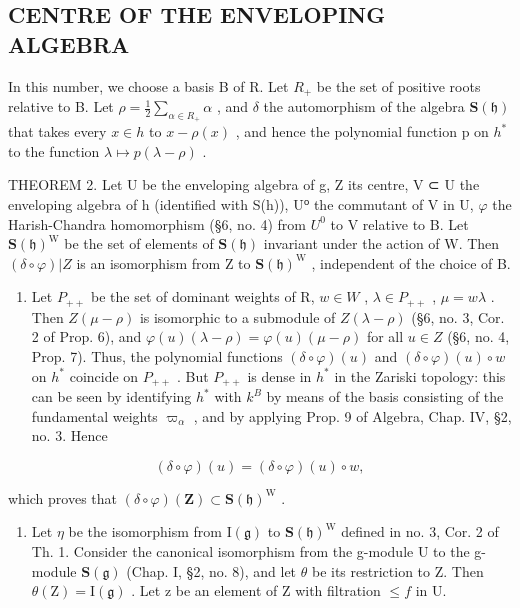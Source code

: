 \subsection{CENTRE OF THE ENVELOPING ALGEBRA}

In this number, we choose a basis B of R. Let \(R_{+}\) be the set of positive roots relative to B. Let \(\rho = \frac{1}{2} \sum_{\alpha \in R_{+}} \alpha\) , and \(\delta\) the automorphism of the algebra \(\mathbf{S}(\mathfrak{h})\) that takes every \(x \in h\) to \(x - \rho(x)\) , and hence the polynomial function p on \(h^{*}\) to the function \(\lambda \mapsto p(\lambda - \rho)\) .

THEOREM 2. Let U be the enveloping algebra of g, Z its centre, V ⊂ U the enveloping algebra of h (identified with S(h)), U⁰ the commutant of V in U, \(\varphi\) the Harish-Chandra homomorphism (§6, no. 4) from \(U^{0}\) to V relative to B. Let \(\mathbf{S}(\mathfrak{h})^{\mathrm{W}}\) be the set of elements of \(\mathbf{S}(\mathfrak{h})\) invariant under the action of W. Then \((\delta\circ\varphi)|Z\) is an isomorphism from Z to \(\mathbf{S}(\mathfrak{h})^{\mathrm{W}}\) , independent of the choice of B.

\begin{enumerate}
\def\labelenumi{\alph{enumi})}
\tightlist
\item
  Let \(P_{++}\) be the set of dominant weights of R, \(w \in W\) , \(\lambda \in P_{++}\) , \(\mu = w\lambda\) . Then \(Z(\mu - \rho)\) is isomorphic to a submodule of \(Z(\lambda - \rho)\) (§6, no. 3, Cor. 2 of Prop. 6), and \(\varphi(u)(\lambda - \rho) = \varphi(u)(\mu - \rho)\) for all \(u \in Z\) (§6, no. 4, Prop. 7). Thus, the polynomial functions \((\delta \circ \varphi)(u)\) and \((\delta \circ \varphi)(u) \circ w\) on \(h^{*}\) coincide on \(P_{++}\) . But \(P_{++}\) is dense in \(h^{*}\) in the Zariski topology: this can be seen by identifying \(h^{*}\) with \(k^{B}\) by means of the basis consisting of the fundamental weights \(\varpi_{\alpha}\) , and by applying Prop. 9 of Algebra, Chap. IV, §2, no. 3. Hence
\end{enumerate}

\[
(\delta \circ \varphi) (u) = (\delta \circ \varphi) (u) \circ w,
\]

which proves that \((\delta \circ \varphi)(\mathbf{Z}) \subset \mathbf{S}(\mathfrak{h})^{\mathrm{W}}\) .

\begin{enumerate}
\def\labelenumi{\alph{enumi})}
\setcounter{enumi}{1}
\tightlist
\item
  Let \(\eta\) be the isomorphism from \(\mathrm{I}(\mathfrak{g})\) to \(\mathbf{S}(\mathfrak{h})^{\mathrm{W}}\) defined in no. 3, Cor. 2 of Th. 1. Consider the canonical isomorphism from the g-module U to the g-module \(\mathbf{S}(\mathfrak{g})\) (Chap. I, §2, no. 8), and let \(\theta\) be its restriction to Z. Then \(\theta(\mathrm{Z}) = \mathrm{I}(\mathfrak{g})\) . Let z be an element of Z with filtration \(\leq f\) in U.
\end{enumerate}

